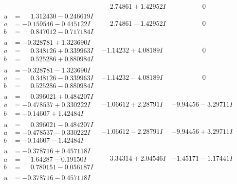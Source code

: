 \documentclass[1p]{elsarticle_modified}
\theoremstyle{definition}
\begin{document}
$$\begin{array}{c|c|c}
 & \phantom{-}2.74861 + 1.42952 I & \phantom{-0.000000 } 0 \\ \hline\begin{aligned}
u &= \phantom{-}1.312430 - 0.246619 I \\
a &= -0.159546 - 0.445122 I \\
b &= \phantom{-}0.847012 - 0.717184 I\end{aligned}
 & \phantom{-}2.74861 - 1.42952 I & \phantom{-0.000000 } 0 \\ \hline\begin{aligned}
u &= -0.328781 + 1.323690 I \\
a &= \phantom{-}0.348126 + 0.339963 I \\
b &= \phantom{-}0.525286 + 0.880984 I\end{aligned}
 & -1.14232 + 4.08189 I & \phantom{-0.000000 } 0 \\ \hline\begin{aligned}
u &= -0.328781 - 1.323690 I \\
a &= \phantom{-}0.348126 - 0.339963 I \\
b &= \phantom{-}0.525286 - 0.880984 I\end{aligned}
 & -1.14232 - 4.08189 I & \phantom{-0.000000 } 0 \\ \hline\begin{aligned}
u &= \phantom{-}0.396021 + 0.484207 I \\
a &= -0.478537 + 0.330222 I \\
b &= -0.14607 + 1.42484 I\end{aligned}
 & -1.06612 + 2.28791 I & -9.94456 - 3.29711 I \\ \hline\begin{aligned}
u &= \phantom{-}0.396021 - 0.484207 I \\
a &= -0.478537 - 0.330222 I \\
b &= -0.14607 - 1.42484 I\end{aligned}
 & -1.06612 - 2.28791 I & -9.94456 + 3.29711 I \\ \hline\begin{aligned}
u &= -0.378716 + 0.457118 I \\
a &= \phantom{-}1.64287 - 0.19150 I \\
b &= \phantom{-}0.780151 - 0.056187 I\end{aligned}
 & \phantom{-}3.34314 + 2.04546 I & -1.45171 - 1.17441 I \\ \hline\begin{aligned}
u &= -0.378716 - 0.457118 I \\

\end{aligned}
\end{array}$$
\end{document}

